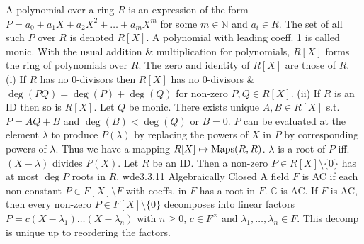  A polynomial over a ring $R$ is an expression of the form $P = a_0 + a_1X + a_2X^2 + \dots + a_mX^m$ for some $m \in \mathbb{N}$ and $a_i \in R$. The set of all such $P$ over $R$ is denoted $R[X]$. A polynomial with leading coeff. 1 is called monic.
 With the usual addition \& multiplication for polynomials, $R[X]$ forms the ring of polynomials over $R$. The zero and identity of $R[X]$ are those of $R$.
(i) If $R$ has no 0-divisors then $R[X]$ has no 0-divisors \& $\deg(PQ) = \deg(P) + \deg(Q)$ for non-zero $P, Q \in R[X]$.
(ii) If $R$ is an ID then so is $R[X]$.
 Let $Q$ be monic. There exists unique $A, B \in R[X]$ s.t. $P = AQ + B$ and $\deg(B) < \deg(Q)$ or $B = 0$.
 $P$ can be evaluated at the element $\lambda$ to produce $P(\lambda)$ by replacing the powers of $X$ in $P$ by corresponding powers of $\lambda$. Thus we have a mapping $R[X] \mapsto \text{Maps}(R, R)$.
 $\lambda$ is a root of $P$ iff. $(X - \lambda)$ divides $P(X)$.
 Let $R$ be an ID. Then a non-zero $P \in R[X] \setminus \{0\}$ has at most $\deg{P}$ roots in $R$.
wde{3.3.11 Algebraically Closed} A field $F$ is AC if each non-constant $P \in F[X] \setminus F$ with coeffs. in $F$ has a root in $F$.
 $\mathbb{C}$ is AC. 
 If $F$ is AC, then every non-zero $P \in F[X] \setminus \{0\}$ decomposes into linear factors $P = c(X - \lambda_1) \dots (X - \lambda_n)$ with $n \ge 0$, $c \in F^{\times}$ and $\lambda_1, \dots, \lambda_n \in F$. This decomp is unique up to reordering the factors.
